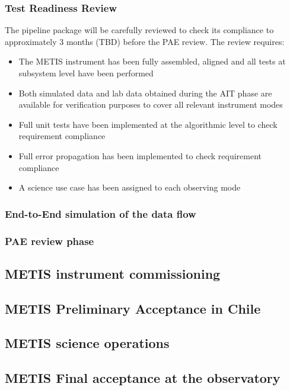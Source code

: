 \subsubsection{Test Readiness Review}
\label{sssec:trr}

The pipeline package will be carefully reviewed to check its compliance to \cite{1618} approximately 3 months (TBD) before the PAE review. The review requires:
\begin{itemize}
    \item The METIS instrument has been fully assembled, aligned and all tests at subsystem level have been performed
    \item Both simulated data and lab data obtained during the AIT phase are available for verification purposes to cover all relevant instrument modes
    \item Full unit tests have been implemented at the algorithmic level to check requirement compliance
    \item Full error propagation has been implemented to check requirement compliance
    \item A science use case has been assigned to each observing mode
\end{itemize}

\subsubsection{End-to-End simulation of the data flow}
\label{sssec:e2e}

\subsubsection{PAE review phase}
\label{sssec:paw_review}



\subsection{METIS instrument commissioning}
\label{ssec:commissioning}

\subsection{METIS Preliminary Acceptance in Chile}
\label{ssec:pae_chile}

\subsection{METIS science operations}
\label{ssec:sciops}

\subsection{METIS Final acceptance at the observatory}
\label{ssec:fao}